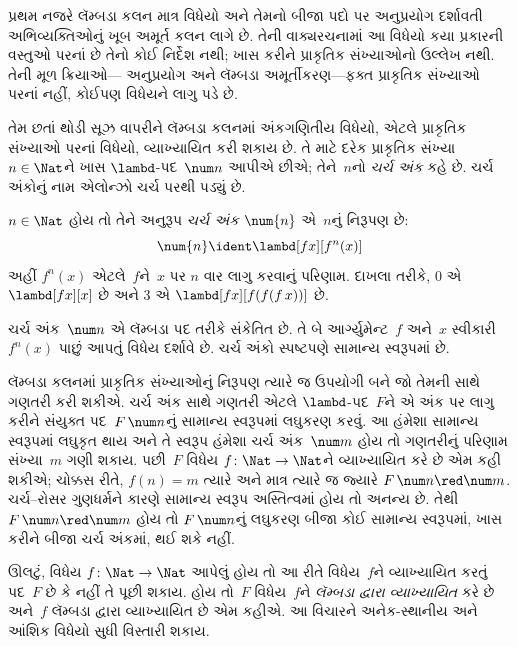 \begingroup
\makeatletter{}\makeatother

\label{guunit:OLP-0374}


પ્રથમ નજરે લૅમ્બડા કલન માત્ર વિધેયો અને તેમનો બીજા
પદો પર અનુપ્રયોગ દર્શાવતી અભિવ્યક્તિઓનું ખૂબ અમૂર્ત
કલન લાગે છે. તેની વાક્યરચનામાં આ વિધેયો કયા પ્રકારની
વસ્તુઓ પરનાં છે તેનો કોઈ નિર્દેશ નથી; ખાસ કરીને
પ્રાકૃતિક સંખ્યાઓનો ઉલ્લેખ નથી. તેની મૂળ ક્રિયાઓ—
અનુપ્રયોગ અને લૅમ્બડા અમૂર્તીકરણ—ફક્ત પ્રાકૃતિક
સંખ્યાઓ પરનાં નહીં, કોઈપણ વિધેયને લાગુ પડે છે.

તેમ છતાં થોડી સૂઝ વાપરીને લૅમ્બડા કલનમાં
અંકગણિતીય વિધેયો, એટલે પ્રાકૃતિક સંખ્યાઓ પરનાં
વિધેયો, વ્યાખ્યાયિત કરી શકાય છે. તે માટે દરેક
પ્રાકૃતિક સંખ્યા~$n \in \Nat$ને ખાસ
$\lambd$-પદ~$\num n$ આપીએ છીએ; તેને~$n$નો
\emph{ચર્ચ અંક} કહે છે. ચર્ચ અંકોનું નામ એલોન્ઝો
ચર્ચ પરથી પડ્યું છે.

\begin{defn}
  $n \in \Nat$ હોય તો તેને અનુરૂપ \emph{ચર્ચ અંક}
  $\num{n}$ એ~$n$નું નિરૂપણ છે:
  \[
    \num{n} \ident \lambd[fx][f^n(x)]
  \]
  અહીં $f^n(x)$ એટલે~$f$ને~$x$ પર $n$ વાર
  લાગુ કરવાનું પરિણામ. દાખલા તરીકે,
  $\num{0}$ એ $\lambd[fx][x]$ છે અને
  $\num{3}$ એ $\lambd[fx][f(f(f\,x))]$ છે.
\end{defn}
  
ચર્ચ અંક~$\num n$ એ લૅમ્બડા પદ તરીકે સંકેતિત
છે. તે બે આર્ગ્યુમેન્ટ~$f$ અને~$x$ સ્વીકારી
$f^n(x)$ પાછું આપતું વિધેય દર્શાવે છે. ચર્ચ
અંકો સ્પષ્ટપણે સામાન્ય સ્વરૂપમાં છે.

લૅમ્બડા કલનમાં પ્રાકૃતિક સંખ્યાઓનું નિરૂપણ ત્યારે જ
ઉપયોગી બને જો તેમની સાથે ગણતરી કરી શકીએ. ચર્ચ અંક
સાથે ગણતરી એટલે $\lambd$-પદ~$F$ને એ અંક પર
લાગુ કરીને સંયુક્ત પદ~$F\, \num n$નું સામાન્ય
સ્વરૂપમાં લઘુકરણ કરવું. આ હંમેશા સામાન્ય સ્વરૂપમાં
લઘુકૃત થાય અને તે સ્વરૂપ હંમેશા ચર્ચ અંક~$\num m$
હોય તો ગણતરીનું પરિણામ સંખ્યા~$m$ ગણી શકાય.
પછી~$F$ વિધેય $f\colon \Nat \to \Nat$ને
વ્યાખ્યાયિત કરે છે એમ કહી શકીએ; ચોક્કસ રીતે,
$f(n) = m$ ત્યારે અને માત્ર ત્યારે જ જ્યારે
$F\, \num n \red \num m$. ચર્ચ--રોસર ગુણધર્મને
કારણે સામાન્ય સ્વરૂપ અસ્તિત્વમાં હોય તો અનન્ય છે.
તેથી $F\, \num n \red \num m$ હોય તો
$F \, \num n$નું લઘુકરણ બીજા કોઈ સામાન્ય
સ્વરૂપમાં, ખાસ કરીને બીજા ચર્ચ અંકમાં, થઈ શકે નહીં.

ઊલટું, વિધેય $f\colon \Nat \to \Nat$ આપેલું હોય
તો આ રીતે વિધેય~$f$ને વ્યાખ્યાયિત કરતું પદ~$F$ છે કે
નહીં તે પૂછી શકાય. હોય તો~$F$ વિધેય~$f$ને
\emph{લૅમ્બડા દ્વારા વ્યાખ્યાયિત} કરે છે અને~$f$
લૅમ્બડા દ્વારા વ્યાખ્યાયિત છે એમ કહીએ. આ વિચારને
અનેક-સ્થાનીય અને આંશિક વિધેયો સુધી વિસ્તારી શકાય.

